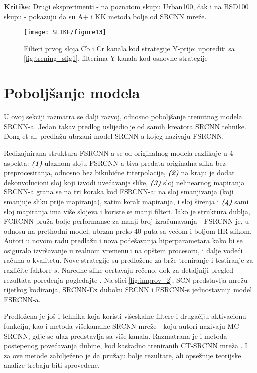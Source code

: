 \documentclass[12pt]{report}
\numberwithin{equation}{section}
\begin{document}
 \textbf{Kritike}: Drugi eksprerimenti - na poznatom skupu Urban100, čak i na BSD100 skupu - pokazuju da su A+ i KK metoda bolje od SRCNN mreže. \cite{files}


\begin{figure}[h]
\texttt{[image: SLIKE/figure13]}
\centering
\caption{Filteri prvog sloja Cb i Cr kanala kod strategije Y-prije: uporediti sa \ref{fig:trening_sfig1}, filterima Y kanala kod osnovne strategije}
\label{fig:13ogled}
\end{figure}

\chapter{Poboljšanje modela}\label{ch2} 

 U ovoj sekciji razmatra se dalji razvoj, odnosno poboljšanje trenutnog modela SRCNN-a. Jedan takav predlog uslijedio je od samih kreatora SRCNN tehnike. Dong et al. predlažu ubrzani model SRCNN-a kojeg nazivaju FSRCNN. \cite{improv1}
  
  Redizajnirana struktura FSRCNN-a se od originalnog modela razlikuje u 4 aspekta: \textbf{\textit{(1)}} ulaznom sloju FSRCNN-a biva predata originalna slika bez preprocesiranja, odnosno bez bikubične interpolacije, \textit{\textbf{(2)}} na kraju je dodat dekonvolucioni sloj koji izvodi uvećavanje slike, \textit{\textbf{(3)}} sloj nelinearnog mapiranja SRCNN-a grana se na tri koraka kod FSRCNN-a: na sloj smanjivanja (koji smanjuje sliku prije mapiranja), zatim korak mapiranja, i sloj širenja i \textit{\textbf{(4)}} sami sloj mapiranja ima više slojeva i koriste se manji filteri. Iako je struktura dublja, FCRCNN pruža bolje performanse za manji broj izračunavanja - FSRCNN je, u odnosu na prethodni model, ubrzan preko 40 puta sa većom i boljom HR slikom. Autori u novom radu predlažu i nova podešavanja hiperparametara kako bi se osiguralo izvršavanje u realnom vremenu i na opštem procesoru, i dalje vodeći računa o kvalitetu. Nove strategije su predložene za  brže treniranje i testiranje za različite faktore $s$. 
 Naredne slike ocrtavaju rečeno, dok za detaljniji pregled rezultata poređenja pogledajte \cite{supp2}. Na slici \ref{fig:improv_2}, SCN predstavlja mrežu rijetkog kodiranja, SRCNN-Ex duboku SRCNN i FSRCNN-s jednostavniji model FSRCNN-a.
    
 Predložena je još i tehnika \cite{improv2} koja koristi višeskalne filtere i drugačiju aktivacionu funkciju, kao i metoda višekanalne SRCNN mreže \cite{improv3} - koju autori nazivaju MC-SRCNN, gdje se ulaz predstavlja sa više kanala. Razmatrana je i metoda postepenog povećavanja dubine, kod kaskadno treniranih CT-SRCNN mreža \cite{improv4}. I za ove metode zabilježeno je da pružaju bolje rezultate, ali opsežnije teorijske analize trebaju biti sprovedene.
 
\end{document}
